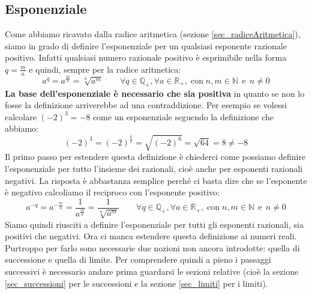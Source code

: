 \subsection{Esponenziale}
Come abbiamo ricavato dalla radice aritmetica (sezione \ref{sec_radiceAritmetica}), siamo in grado di definire l'esponenziale per un qualsiasi esponente razionale positivo. Infatti qualsiasi numero razionale positivo è esprimibile nella forma $q = \frac{m}{n}$ e quindi, sempre per la radice aritmetica:
\begin{equation*}
    a^q = a^{\frac{m}{n}} = \sqrt[n]{a^m} \qquad \forall q \in \mathbb{Q}_{+}, \forall a \in \mathbb{R}_{+},\; \mathrm{con}\; n,m \in \mathbb{N}\;\, \mathrm{e}\;\, n \neq 0
\end{equation*}
\textbf{La base dell'esponenziale è necessario che sia positiva} in quanto se non lo fosse la definizione arriverebbe ad una contraddizione. Per esempio se volessi calcolare $(-2)^3 = -8$ come un esponenziale seguendo la definizione che abbiamo:
\begin{equation*}
    (-2)^3 = (-2)^{\frac{6}{2}} = \sqrt{(-2)^6} = \sqrt{64} = 8 \neq -8
\end{equation*}
Il primo passo per estendere questa definizione è chiederci come possiamo definire l'esponenziale per tutto l'insieme dei razionali, cioè anche per esponenti razionali negativi. La risposta è abbastanza semplice perché ci basta dire che se l'esponente è negativo calcoliamo il reciproco con l'esponente positivo:
\begin{equation*}
    a^{-q} = a^{-\frac{m}{n}} = \dfrac{1}{a^{\frac{m}{n}}} = \dfrac{1}{\sqrt[n]{a^m}} \qquad \forall q \in \mathbb{Q}_{+}, \forall a \in \mathbb{R}_{+},\; \mathrm{con}\; n,m \in \mathbb{N}\;\, \mathrm{e}\;\, n \neq 0
\end{equation*}
Siamo quindi riusciti a definire l'esponenziale per tutti gli esponenti razionali, sia positivi che negativi. Ora ci manca estendere questa definizione ai numeri reali. Purtroppo per farlo sono necessarie due nozioni non ancora introdotte: quella di successione e quella di limite. Per comprendere quindi a pieno i passaggi successivi è necessario andare prima guardarsi le sezioni relative (cioè la sezione \ref{sec_successioni} per le successioni e la sezione \ref{sec_limiti} per i limiti).\\

